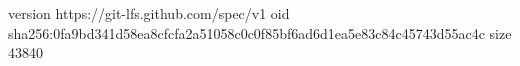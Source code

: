 version https://git-lfs.github.com/spec/v1
oid sha256:0fa9bd341d58ea8cfcfa2a51058c0c0f85bf6ad6d1ea5e83c84c45743d55ac4c
size 43840
